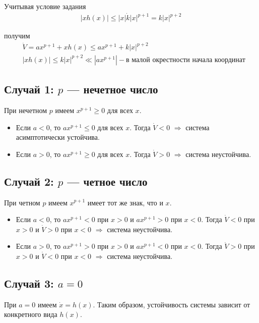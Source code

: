 Учитывая условие задания 
\begin{align*}
|xh(x)| \le |x| \dot k|x|^{p+1} = k|x|^{p+2}
\end{align*}

получим 
\begin{align*}
& \dot{V} = ax^{p+1} + xh(x) \le ax^{p+1} + k|x|^{p+2} \\
& |xh(x)| \leq k|x|^{p+2} \ll |ax^{p+1}| - \text{в малой окрестности начала координат}
\end{align*}

\subsection{Случай 1: $p$ — нечетное число}

При нечетном $p$ имеем $x^{p+1} \geq 0$ для всех $x$.

\begin{itemize}
\item Если $a < 0$, то $ax^{p+1} \leq 0$ для всех $x$.
Тогда $\dot{V} < 0$ $\Rightarrow$ система асимптотически устойчива.
\item Если $a > 0$, то $ax^{p+1} \geq 0$ для всех $x$.
Тогда $\dot{V} > 0$ $\Rightarrow$ система неустойчива.
\end{itemize}

\subsection{Случай 2: $p$ — четное число}

При четном $p$ имеем $x^{p+1}$ имеет тот же знак, что и $x$.

\begin{itemize}
\item Если $a < 0$, то $ax^{p+1} < 0$ при $x > 0$ и $ax^{p+1} > 0$ при $x < 0$.
Тогда $\dot{V} < 0$ при $x > 0$ и $\dot{V} > 0$ при $x < 0$ $\Rightarrow$ система неустойчива.
\item Если $a > 0$, то $ax^{p+1} > 0$ при $x > 0$ и $ax^{p+1} < 0$ при $x < 0$.
Тогда $\dot{V} > 0$ при $x > 0$ и $\dot{V} < 0$ при $x < 0$ $\Rightarrow$ система неустойчива.
\end{itemize}

\subsection{Случай 3: $a = 0$}

При $a = 0$ имеем $\dot{x} = h(x)$. Таким образом, устойчивость системы зависит от конкретного вида $h(x)$.

